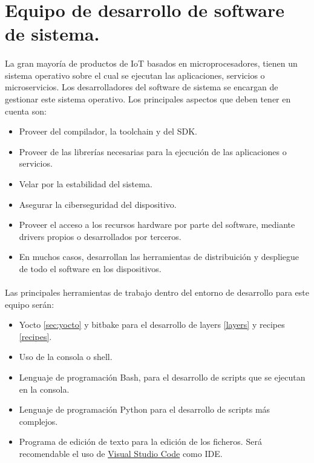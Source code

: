 \section{Equipo de desarrollo de software de sistema.}\label{sec:systemteam}

\paragraph{}La gran mayoría de productos de \gls{IoT} basados en microprocesadores,
tienen un sistema operativo sobre el cual se ejecutan las aplicaciones, servicios o
microservicios. Los desarrolladores del software de sistema se encargan de gestionar
este sistema operativo. Los principales aspectos que deben tener en cuenta son:

\begin{itemize}
    \item Proveer del compilador, la toolchain y del \gls{SDK}.
    \item Proveer de las librerías necesarias para la ejecución de las aplicaciones o
    servicios.
    \item Velar por la estabilidad del sistema.
    \item Asegurar la ciberseguridad del dispositivo.
    \item Proveer el acceso a los recursos hardware por parte del software, mediante
    drivers propios o desarrollados por terceros.
    \item En muchos casos, desarrollan las herramientas de distribuición y despliegue
    de todo el software en los dispositivos.
\end{itemize}

\paragraph{}Las principales herramientas de trabajo dentro del entorno de desarrollo
para este equipo serán:

\begin{itemize}
    \item Yocto \ref{sec:yocto} y bitbake para el desarrollo de layers \ref{layers} y
    recipes \ref{recipes}.
    \item Uso de la consola o \gls{shell}.
    \item Lenguaje de programación Bash, para el desarrollo de \gls{scripts} que se
    ejecutan en la consola.
    \item Lenguaje de programación Python para el desarrollo de \gls{scripts} más complejos.
    \item Programa de edición de texto para la edición de los ficheros. Será recomendable
    el uso de \hyperref[sec:vscode]{Visual Studio Code} como \gls{IDE}.
\end{itemize}

